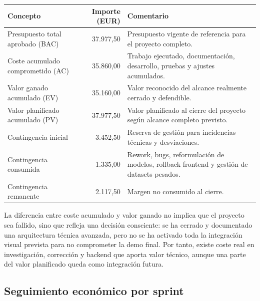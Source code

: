 \documentclass[11pt,a4paper]{article}
\begin{document}
\begin{table}[H]
\centering
\begin{tabular}{p{6cm}r p{6cm}}
\toprule
\textbf{Concepto} & \textbf{Importe (EUR)} & \textbf{Comentario} \\
\midrule
Presupuesto total aprobado (BAC) & 37.977,50 & Presupuesto vigente de referencia para el proyecto completo. \\
Coste acumulado comprometido (AC) & 35.860,00 & Trabajo ejecutado, documentación, desarrollo, pruebas y ajustes acumulados. \\
Valor ganado acumulado (EV) & 35.160,00 & Valor reconocido del alcance realmente cerrado y defendible. \\
Valor planificado acumulado (PV) & 37.977,50 & Valor planificado al cierre del proyecto según alcance completo previsto. \\
Contingencia inicial & 3.452,50 & Reserva de gestión para incidencias técnicas y desviaciones. \\
Contingencia consumida & 1.335,00 & Rework, bugs, reformulación de modelos, rollback frontend y gestión de datasets pesados. \\
Contingencia remanente & 2.117,50 & Margen no consumido al cierre. \\
\bottomrule
\end{tabular}
\end{table}

La diferencia entre coste acumulado y valor ganado no implica que el proyecto sea fallido, sino que refleja una decisión consciente: se ha cerrado y documentado una arquitectura técnica avanzada, pero no se ha activado toda la integración visual prevista para no comprometer la demo final. Por tanto, existe coste real en investigación, corrección y backend que aporta valor técnico, aunque una parte del valor planificado queda como integración futura.

\subsection{Seguimiento económico por sprint}
\end{document}
